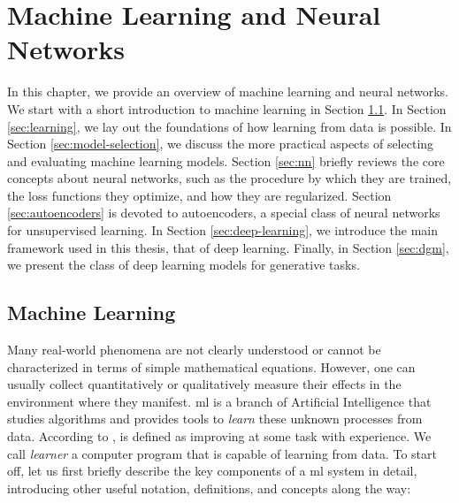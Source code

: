\chapter{Machine Learning and Neural Networks}\label{ch:neural-networks}
In this chapter, we provide an overview of machine learning and neural networks. We start with a short introduction to machine learning in Section \ref{sec:ml}. In Section \ref{sec:learning}, we lay out the foundations of how learning from data is possible. In Section \ref{sec:model-selection}, we discuss the more practical aspects of selecting and evaluating machine learning models. Section \ref{sec:nn} briefly reviews the core concepts about neural networks, such as the procedure by which they are trained, the loss functions they optimize, and how they are regularized. Section \ref{sec:autoencoders} is devoted to autoencoders, a special class of neural networks for unsupervised learning. In Section \ref{sec:deep-learning}, we introduce the main framework used in this thesis, that of deep learning. Finally, in Section \ref{sec:dgm}, we present the class of deep learning models for generative tasks.

\section{Machine Learning}\label{sec:ml}
Many real-world phenomena are not clearly understood or cannot be characterized in terms of simple mathematical equations. However, one can usually collect quantitatively or qualitatively measure their effects in the environment where they manifest. \gls{ml} is a branch of Artificial Intelligence that studies algorithms and provides tools to \emph{learn} these unknown processes from data. According to \citet{mitchell1997ml},  is defined as improving at some task with experience. We call \emph{learner} a computer program that is capable of learning from data. To start off, let us first briefly describe the key components of a \gls{ml} system in detail, introducing other useful notation, definitions, and concepts along the way:

